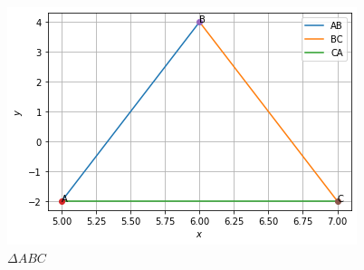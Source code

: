  
 \begin{figure}[h]
 	\centering
 	\includegraphics[width=\columnwidth]{solutions/aug/2/5/FIGURE-1.png}
 	\caption{$\Delta ABC$}
 	\label{aug/2/5/fig:2.5}
 \end{figure}
